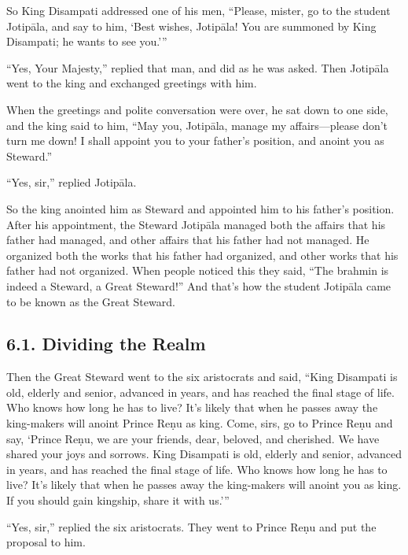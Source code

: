 \documentclass[12pt,openany]{book}%
\begin{document}
So King Disampati addressed one of his men, “Please, mister, go to the student \textsanskrit{Jotipāla}, and say to him, ‘Best wishes, \textsanskrit{Jotipāla}! You are summoned by King Disampati; he wants to see you.’” 

“Yes, Your Majesty,” replied that man, and did as he was asked. Then \textsanskrit{Jotipāla} went to the king and exchanged greetings with him. 

When the greetings and polite conversation were over, he sat down to one side, and the king said to him, “May you, \textsanskrit{Jotipāla}, manage my affairs—please don’t turn me down! I shall appoint you to your father’s position, and anoint you as Steward.” 

“Yes, sir,” replied \textsanskrit{Jotipāla}. 

So the king anointed him as Steward and appointed him to his father’s position. After his appointment, the Steward \textsanskrit{Jotipāla} managed both the affairs that his father had managed, and other affairs that his father had not managed. He organized both the works that his father had organized, and other works that his father had not organized. When people noticed this they said, “The brahmin is indeed a Steward, a Great Steward!” And that’s how the student \textsanskrit{Jotipāla} came to be known as the Great Steward. 

\subsection*{6.1. Dividing the Realm }

Then the Great Steward went to the six aristocrats and said, “King Disampati is old, elderly and senior, advanced in years, and has reached the final stage of life. Who knows how long he has to live? It’s likely that when he passes away the king-makers will anoint Prince \textsanskrit{Reṇu} as king. Come, sirs, go to Prince \textsanskrit{Reṇu} and say, ‘Prince \textsanskrit{Reṇu}, we are your friends, dear, beloved, and cherished. We have shared your joys and sorrows. King Disampati is old, elderly and senior, advanced in years, and has reached the final stage of life. Who knows how long he has to live? It’s likely that when he passes away the king-makers will anoint you as king. If you should gain kingship, share it with us.’” 

“Yes, sir,” replied the six aristocrats. They went to Prince \textsanskrit{Reṇu} and put the proposal to him. 
\end{document}
